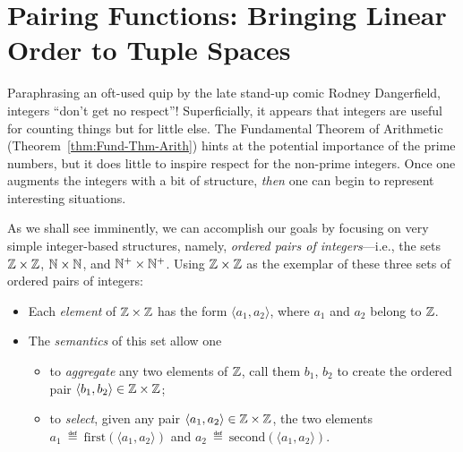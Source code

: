 
\section{Pairing Functions: Bringing Linear Order to Tuple Spaces}
\label{sec:pairing}

Paraphrasing an oft-used quip by the late stand-up comic Rodney Dangerfield, integers ``don't get no respect''!  Superficially, it appears that integers are useful for counting things but for little else.  The Fundamental Theorem of Arithmetic (Theorem~\ref{thm:Fund-Thm-Arith}) hints at the potential importance of the prime numbers, but it does little to inspire respect for the non-prime integers.  Once one augments the integers with a bit of structure, {\em then} one can begin to represent interesting situations.

As we shall see imminently, we can accomplish our goals by focusing on very simple integer-based structures, namely, {\em ordered pairs of integers}---i.e., the sets $\mathbb{Z} \times \mathbb{Z}$, $\mathbb{N} \times \mathbb{N}$, and $\mathbb{N}^+ \times \mathbb{N}^+$.  Using $\mathbb{Z} \times \mathbb{Z}$ as the exemplar of these three sets of ordered pairs of integers:
\begin{itemize}
\item
Each {\em element} of $\mathbb{Z} \times \mathbb{Z}$ has the form $\langle a_1, a_2 \rangle$, where $a_1$ and $a_2$ belong to $\mathbb{Z}$.
\item
The {\em semantics} of this set allow one
  \begin{itemize}
  \item
to {\em aggregate} any two elements of $\mathbb{Z}$, call them $b_1$, $b_2$ to create the ordered pair $\langle b_1, b_2 \rangle \in \mathbb{Z} \times \mathbb{Z}$;
  \item
to {\em select}, given any pair $\langle a_1, a_2 \rangle \in \mathbb{Z} \times \mathbb{Z}$,  the two elements $a_1 \ \eqdef \ \mbox{first}(\langle a_1, a_2 \rangle)$ and $a_2 \ \eqdef \ \mbox{second}(\langle a_1, a_2 \rangle)$.
  \end{itemize}
\end{itemize}

